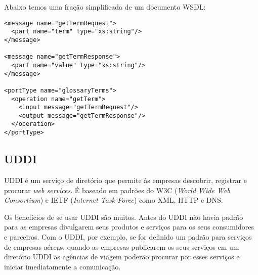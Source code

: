Abaixo temos uma fração simplificada de um documento WSDL:

\lstset{language=XML}
\begin{lstlisting}[caption={WSDL},frame=trBL,breaklines=true,label=listing:wsdl]
<message name="getTermRequest">
  <part name="term" type="xs:string"/>
</message>

<message name="getTermResponse">
  <part name="value" type="xs:string"/>
</message>

<portType name="glossaryTerms">
  <operation name="getTerm">
    <input message="getTermRequest"/>
    <output message="getTermResponse"/>
  </operation>
</portType> 
\end{lstlisting}

\subsection{UDDI}

UDDI é um serviço de diretório que permite às empresas descobrir, registrar e procurar \textit{web services}. É baseado em padrões do W3C (\textit{World Wide Web Consortium}) e IETF (\textit{Internet Task Force}) como XML, HTTP e DNS.

Os benefícios de se usar UDDI são muitos. Antes do UDDI não havia padrão para as empresas divulgarem seus produtos e serviços para os seus consumidores e parceiros. Com o UDDI, por exemplo, se for definido um padrão para serviços de empresas aéreas, quando as empresas publicarem os seus serviços em um diretório UDDI as agências de viagem poderão procurar por esses serviços e iniciar imediatamente a comunicação.













